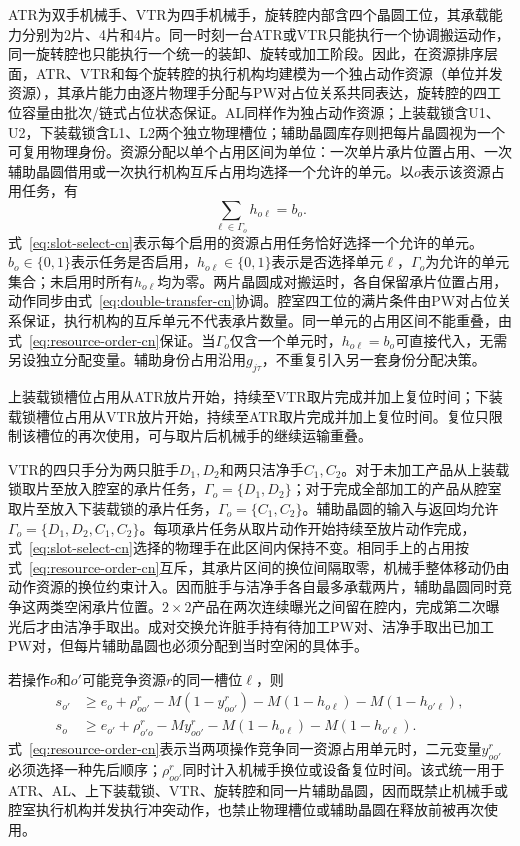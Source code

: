 \documentclass[final,5p,times,twocolumn]{elsarticle}
\begin{document}
ATR为双手机械手、VTR为四手机械手，旋转腔内部含四个晶圆工位，其承载能力分别为2片、4片和4片。同一时刻一台ATR或VTR只能执行一个协调搬运动作，同一旋转腔也只能执行一个统一的装卸、旋转或加工阶段。因此，在资源排序层面，ATR、VTR和每个旋转腔的执行机构均建模为一个独占动作资源（单位并发资源），其承片能力由逐片物理手分配与PW对占位关系共同表达，旋转腔的四工位容量由批次/链式占位状态保证。AL同样作为独占动作资源；上装载锁含U1、U2，下装载锁含L1、L2两个独立物理槽位；辅助晶圆库存则把每片晶圆视为一个可复用物理身份。资源分配以单个占用区间为单位：一次单片承片位置占用、一次辅助晶圆借用或一次执行机构互斥占用均选择一个允许的单元。以$o$表示该资源占用任务，有
\begin{equation}
\sum_{\ell\in\Gamma_o}h_{o\ell}=b_o.
\label{eq:slot-select-cn}
\end{equation}
式~\eqref{eq:slot-select-cn}表示每个启用的资源占用任务恰好选择一个允许的单元。$b_o\in\{0,1\}$表示任务是否启用，$h_{o\ell}\in\{0,1\}$表示是否选择单元$\ell$，$\Gamma_o$为允许的单元集合；未启用时所有$h_{o\ell}$均为零。两片晶圆成对搬运时，各自保留承片位置占用，动作同步由式~\eqref{eq:double-transfer-cn}协调。腔室四工位的满片条件由PW对占位关系保证，执行机构的互斥单元不代表承片数量。同一单元的占用区间不能重叠，由式~\eqref{eq:resource-order-cn}保证。当$\Gamma_o$仅含一个单元时，$h_{o\ell}=b_o$可直接代入，无需另设独立分配变量。辅助身份占用沿用$g_{j\tau}$，不重复引入另一套身份分配决策。

上装载锁槽位占用从ATR放片开始，持续至VTR取片完成并加上复位时间；下装载锁槽位占用从VTR放片开始，持续至ATR取片完成并加上复位时间。复位只限制该槽位的再次使用，可与取片后机械手的继续运输重叠。

VTR的四只手分为两只脏手$D_1,D_2$和两只洁净手$C_1,C_2$。对于未加工产品从上装载锁取片至放入腔室的承片任务，$\Gamma_o=\{D_1,D_2\}$；对于完成全部加工的产品从腔室取片至放入下装载锁的承片任务，$\Gamma_o=\{C_1,C_2\}$。辅助晶圆的输入与返回均允许$\Gamma_o=\{D_1,D_2,C_1,C_2\}$。每项承片任务从取片动作开始持续至放片动作完成，式~\eqref{eq:slot-select-cn}选择的物理手在此区间内保持不变。相同手上的占用按式~\eqref{eq:resource-order-cn}互斥，其承片区间的换位间隔取零，机械手整体移动仍由动作资源的换位约束计入。因而脏手与洁净手各自最多承载两片，辅助晶圆同时竞争这两类空闲承片位置。$2\times2$产品在两次连续曝光之间留在腔内，完成第二次曝光后才由洁净手取出。成对交换允许脏手持有待加工PW对、洁净手取出已加工PW对，但每片辅助晶圆也必须分配到当时空闲的具体手。

若操作$o$和$o'$可能竞争资源$r$的同一槽位$\ell$，则
\begin{equation}
\begin{aligned}
s_{o'}&\ge e_o+\rho^r_{oo'}-M(1-y^r_{oo'})
-M(1-h_{o\ell})-M(1-h_{o'\ell}),\\
s_o&\ge e_{o'}+\rho^r_{o'o}-My^r_{oo'}
-M(1-h_{o\ell})-M(1-h_{o'\ell}).
\end{aligned}
\label{eq:resource-order-cn}
\end{equation}
式~\eqref{eq:resource-order-cn}表示当两项操作竞争同一资源占用单元时，二元变量$y^r_{oo'}$必须选择一种先后顺序；$\rho^r_{oo'}$同时计入机械手换位或设备复位时间。该式统一用于ATR、AL、上下装载锁、VTR、旋转腔和同一片辅助晶圆，因而既禁止机械手或腔室执行机构并发执行冲突动作，也禁止物理槽位或辅助晶圆在释放前被再次使用。
\end{document}

